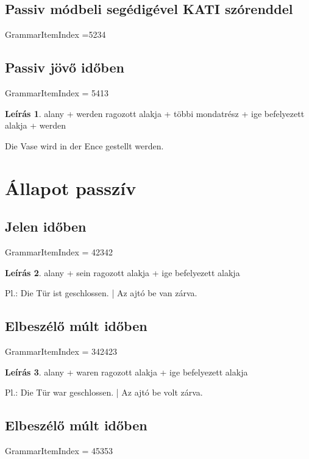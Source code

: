 \documentclass{article}
\theoremstyle{definition}
\newtheorem*{desc}{Leírás}
\begin{document}
\subsection{Passiv módbeli segédigével KATI szórenddel}

GrammarItemIndex =5234

\subsection{Passiv jövő időben}

GrammarItemIndex = 5413

\begin{desc}
alany + werden ragozott alakja + többi mondatrész + ige befelyezett alakja + werden

Die Vase wird in der Ence gestellt werden.
\end{desc}

\section{Állapot passzív}

\subsection{Jelen időben}

GrammarItemIndex = 42342

\begin{desc}
alany + sein ragozott alakja + ige befelyezett alakja

Pl.: Die Tür ist geschlossen. | Az ajtó be van zárva.
\end{desc}

\subsection{Elbeszélő múlt időben}

GrammarItemIndex = 342423

\begin{desc}
alany + waren ragozott alakja + ige befelyezett alakja

Pl.: Die Tür war geschlossen. | Az ajtó be volt zárva.
\end{desc}

\subsection{Elbeszélő múlt időben}

GrammarItemIndex = 45353
\end{document}
